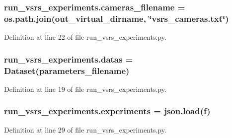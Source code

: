 \subsubsection[{\texorpdfstring{cameras\+\_\+filename}{cameras_filename}}]{\setlength{\rightskip}{0pt plus 5cm}run\+\_\+vsrs\+\_\+experiments.\+cameras\+\_\+filename = os.\+path.\+join({\bf out\+\_\+virtual\+\_\+dirname}, \char`\"{}vsrs\+\_\+cameras.\+txt\char`\"{})}\hypertarget{namespacerun__vsrs__experiments_ab3219370020230066ea966510359fbc1}{}\label{namespacerun__vsrs__experiments_ab3219370020230066ea966510359fbc1}


Definition at line 22 of file run\+\_\+vsrs\+\_\+experiments.\+py.

\subsubsection[{\texorpdfstring{datas}{datas}}]{\setlength{\rightskip}{0pt plus 5cm}run\+\_\+vsrs\+\_\+experiments.\+datas = {\bf Dataset}({\bf parameters\+\_\+filename})}\hypertarget{namespacerun__vsrs__experiments_aacf2ecb4f74a741c31ee436ca7018d07}{}\label{namespacerun__vsrs__experiments_aacf2ecb4f74a741c31ee436ca7018d07}


Definition at line 19 of file run\+\_\+vsrs\+\_\+experiments.\+py.

\subsubsection[{\texorpdfstring{experiments}{experiments}}]{\setlength{\rightskip}{0pt plus 5cm}run\+\_\+vsrs\+\_\+experiments.\+experiments = json.\+load(f)}\hypertarget{namespacerun__vsrs__experiments_a77b5d05bfd21ce9b4ff6b6e6545587d0}{}\label{namespacerun__vsrs__experiments_a77b5d05bfd21ce9b4ff6b6e6545587d0}


Definition at line 29 of file run\+\_\+vsrs\+\_\+experiments.\+py.

